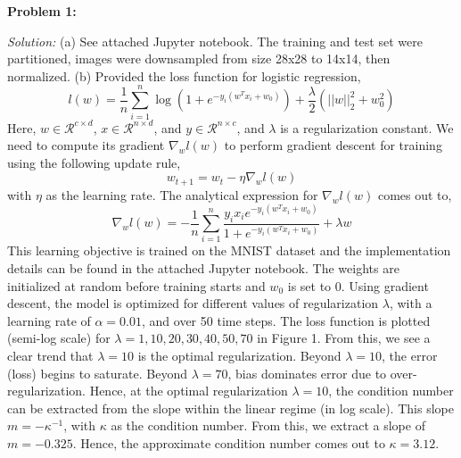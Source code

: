 \documentclass[12pt]{article}
\begin{document}
\maketitle


\textbf{Problem 1:}  \newline 
\newline 


\emph{Solution:} 
\newline \newline 
(a) See attached Jupyter notebook. The training and test set were partitioned, images were downsampled from size 28x28 to 14x14, then normalized. \newline \newline 
(b) Provided the loss function for logistic regression, 
$$l(w) = \frac{1}{n} \sum_{i=1}^{n} \log (1 + e^{-y_{i} (w^{T}  x_{i} + w_{0} ) }  )  + \frac{\lambda}{2}  (||w||_2^{2} + w_{0}^{2} )  $$
Here, $w \in  \mathcal{R}^{c\times d}$,  $x \in  \mathcal{R}^{n \times d}$, and $y \in  \mathcal{R}^{n \times c}$, and $\lambda$ is a regularization constant. We need to compute its gradient $\nabla_{w}  l(w) $ to perform gradient descent for training using the following update rule, 
$$w_{t+1} = w_{t} - \eta  \nabla_{w}  l(w)$$ 
with $\eta$ as the learning rate. The analytical expression for $ \nabla_{w}  l(w)$ comes out to,
$$ \nabla_{w}  l(w) = - \frac{1}{n} \sum_{i=1}^{n}  \frac{y_{i} x_{i} e^{-y_{i} (w^{T} x_{i} + w_{0} ) }  }{1+ e^{-y_{i} (w^{T} x_{i} + w_{0} ) } }    + \lambda w  $$
This learning objective is trained on the MNIST dataset and the implementation details can be found in the attached Jupyter notebook. The weights are initialized at random before training starts and $w_{0}$ is set to 0. Using gradient descent, the model is optimized for different values of regularization $\lambda$, with a learning rate of $\alpha = 0.01$, 
and over 50 time steps. The loss function is plotted (semi-log scale) for $\lambda = 1,10,20,30,40,50,70$ in Figure 1. From this, we see a clear trend that $\lambda = 10$ is the optimal regularization. Beyond $\lambda =10$, the error (loss) begins to saturate. Beyond $\lambda = 70$, bias dominates error due to over-regularization. Hence, at the optimal regularization $\lambda = 10$, the condition number can be extracted from the slope within the linear regime (in log scale). This slope $m = - \kappa^{-1}$, with $\kappa$ as the condition number. From this, we extract a slope of $m = -0.325$. Hence, the approximate condition number comes out to $\kappa = 3.12$.      
\newline 
\newline
\end{document}
